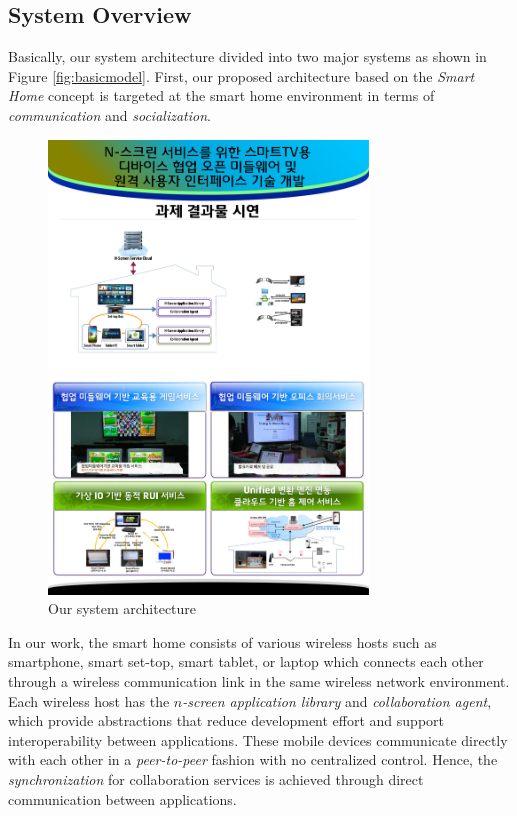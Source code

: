 \documentclass[conference]{IEEEtran}
\begin{document}
\subsection{System Overview}
Basically, our system architecture divided into two major systems as shown in Figure  \ref{fig:basicmodel}. 
First, our proposed architecture based on the \textit{Smart Home} concept is targeted at the smart home environment in terms of \textit{communication} and \textit{socialization}. 
    \begin{figure}[htb] %
    \centering
    \includegraphics[width=8.5cm,keepaspectratio]{systemarchitecture_2}
    \caption{Our system architecture}
    \label{fig:architecture}
    \end{figure}

In our work, the smart home consists of various wireless hosts such as smartphone, smart set-top, smart tablet, or laptop which connects each other through a wireless communication link in the same wireless network environment. Each wireless host has the \textit{$n$-screen application library} and \textit{collaboration agent}, which provide abstractions that reduce development effort and support interoperability between applications. These mobile devices communicate directly with each other in a \textit{peer-to-peer} fashion with no centralized control.  Hence, the \textit{synchronization} for collaboration services is achieved through direct communication between applications.
\end{document}
